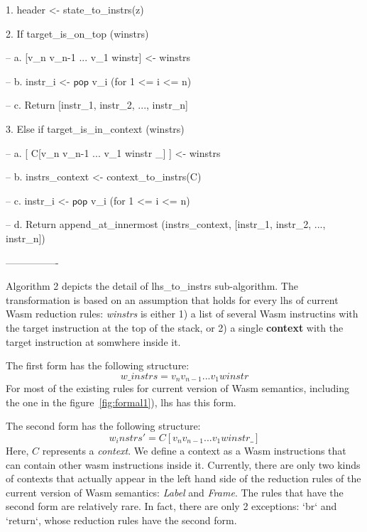 1. header <- state\_to\_instrs(z)

2. If target\_is\_on\_top (winstrs)

-- a. [v\_n v\_n-1 ... v\_1 winstr] <- winstrs

-- b. instr\_i <- $\mathsf{pop}$ v\_i (for 1 <= i <= n)

-- c. Return [instr\_1, instr\_2, ..., instr\_n]

3. Else if target\_is\_in\_context (winstrs)

-- a. [ C[v\_n v\_n-1 ... v\_1 winstr \_] ] <- winstrs

-- b. instrs\_context <- context\_to\_instrs(C)

-- c. instr\_i <- $\mathsf{pop}$ v\_i (for 1 <= i <= n)

-- d. Return append\_at\_innermost (instrs\_context, [instr\_1, instr\_2, ..., instr\_n])

----------------

Algorithm 2 depicts the detail of lhs\_to\_instrs sub-algorithm.
The transformation is based on an assumption that holds for every lhs of current Wasm reduction rules:
\textit{winstrs} is either 1) a list of several Wasm instructins with the target instruction at the top of the stack,
or 2) a single \textbf{context} with the target instruction at somwhere inside it.

The first form has the following structure:
\[
w\_instrs = v_n v_{n-1} ... v_1 winstr
\]
For most of the existing rules for current version of Wasm semantics, including the one in the figure~\ref{fig:formal1}),
lhs has this form.

The second form has the following structure:
\[
w_instrs' = C[v_n v_{n-1} ... v_1 winstr \_]
\]
Here, $C$ represents a \textit{context}. We define a context as a Wasm instructions that
can contain other wasm instructions inside it. Currently, there are only two kinds of
contexts that actually appear in the left hand side of the reduction rules of the
current version of Wasm semantics: \textit{Label} and \textit{Frame}.
The rules that have the second form are relatively rare.
In fact, there are only 2 exceptions: `br` and `return`, whose reduction rules
have the second form.

